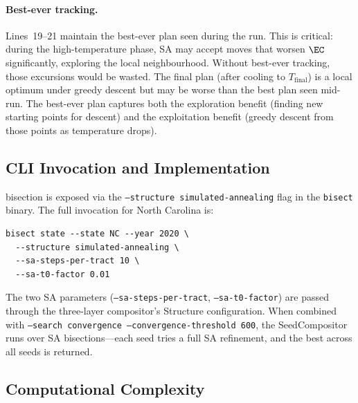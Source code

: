 \paragraph{Best-ever tracking.}
Lines~19--21 maintain the best-ever plan seen during the run.
This is critical: during the high-temperature phase, SA may accept moves
that worsen $\EC$ significantly, exploring the local neighbourhood.
Without best-ever tracking, those excursions would be wasted.
The final plan (after cooling to $T_{\mathrm{final}}$) is a local optimum
under greedy descent but may be worse than the best plan seen mid-run.
The best-ever plan captures both the exploration benefit (finding new
starting points for descent) and the exploitation benefit (greedy descent
from those points as temperature drops).

\subsection{CLI Invocation and Implementation}

\sa{} bisection is exposed via the \texttt{--structure simulated-annealing}
flag in the \texttt{bisect} binary.
The full invocation for North Carolina is:

\begin{verbatim}
bisect state --state NC --year 2020 \
  --structure simulated-annealing \
  --sa-steps-per-tract 10 \
  --sa-t0-factor 0.01
\end{verbatim}

The two SA parameters (\texttt{--sa-steps-per-tract}, \texttt{--sa-t0-factor})
are passed through the three-layer compositor's Structure configuration.
When combined with \texttt{--search convergence --convergence-threshold 600},
the SeedCompositor runs \cs{} over SA bisections---each seed tries a full
SA refinement, and the best across all seeds is returned.

\subsection{Computational Complexity}

